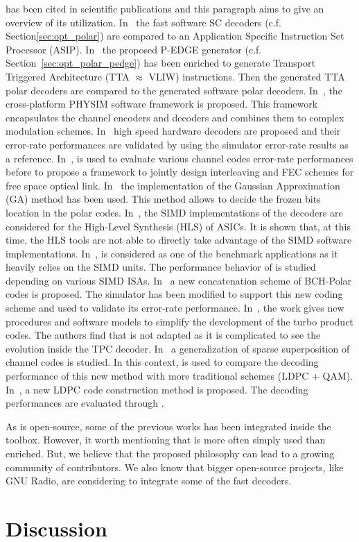 \AFFECT has been cited in scientific publications and this paragraph aims to
give an overview of its utilization. In~\cite{Leonardon2018a} the \AFFECT fast
software SC decoders (c.f. Section\ref{sec:opt_polar}) are compared to an
Application Specific Instruction Set Processor (ASIP). In~\cite{Leonardon2018b}
the proposed P-EDGE generator (c.f. Section~\ref{sec:opt_polar_pedge}) has been
enriched to generate Transport Triggered Architecture (TTA $\approx$ VLIW)
instructions. Then the generated TTA polar decoders are compared to the \AFFECT
generated software polar decoders. In~\cite{Florian2018}, the cross-platform
PHYSIM software framework is proposed. This framework encapsulates the \AFFECT
channel encoders and decoders and combines them to complex modulation schemes.
In~\cite{Pignoly2018,Ghanaatian2018,Wang2019} high speed hardware decoders are
proposed and their error-rate performances are validated by using the \AFFECT
simulator error-rate results as a reference. In~\cite{Poulenard2018}, \AFFECT is
used to evaluate various channel codes error-rate performances before to propose
a framework to jointly design interleaving and FEC schemes for free space
optical link. In~\cite{Cavatassi2019a,Cavatassi2019b} the \AFFECT implementation
of the Gaussian Approximation (GA) method has been used. This method allows to
decide the frozen bits location in the polar codes. In~\cite{Cenova2019}, the
SIMD implementations of the \AFFECT decoders are considered for the High-Level
Synthesis (HLS) of ASICs. It is shown that, at this time, the HLS tools are not
able to directly take advantage of the \Cxx SIMD software implementations.
In~\cite{Guermouche2019}, \AFFECT is considered as one of the benchmark
applications as it heavily relies on the SIMD units. The performance behavior of
\AFFECT is studied depending on various SIMD ISAs. In~\cite{Wang2019} a new
concatenation scheme of BCH-Polar codes is proposed. The \AFFECT simulator has
been modified to support this new coding scheme and used to validate its
error-rate performance. In~\cite{Krainyk2019}, the work gives new procedures and
software models to simplify the development of the turbo product codes. The
authors find that \AFFECT is not adapted as it is complicated to see the
evolution inside the TPC decoder. In~\cite{Hsieh2020,Rush2020} a generalization
of sparse superposition of channel codes is studied. In this context, \AFFECT is
used to compare the decoding performance of this new method with more
traditional schemes (LDPC + QAM). In~\cite{Tasdighi2020}, a new LDPC code
construction method is proposed. The decoding performances are evaluated through
\AFFECT.

As \AFFECT is open-source, some of the previous works has been integrated inside
the toolbox. However, it worth mentioning that \AFFECT is more often simply used
than enriched. But, we believe that the proposed philosophy can lead to a
growing community of contributors. We also know that bigger open-source
projects, like GNU Radio, are considering to integrate some of the \AFFECT fast
decoders.

\section{Discussion}
